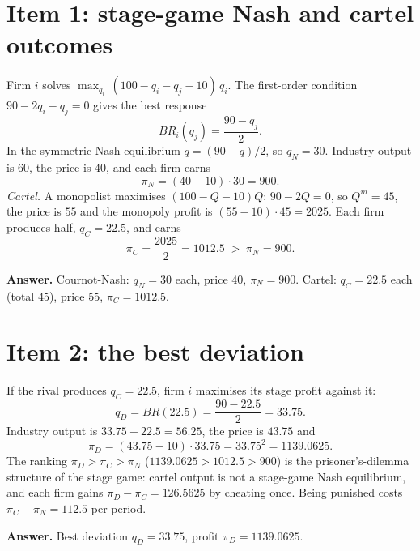 \documentclass[11pt,a4paper]{article}
\newcommand{\answer}[1]{\begin{tcolorbox}[colback=ans!5,colframe=ans,boxrule=0.6pt,
  left=5pt,right=5pt,top=3pt,bottom=3pt]\textbf{Answer.} #1\end{tcolorbox}}
\begin{document}
\section{Item 1: stage-game Nash and cartel outcomes}

Firm $i$ solves $\max_{q_i}\,(100 - q_i - q_j - 10)\,q_i$. The first-order condition
$90 - 2q_i - q_j = 0$ gives the best response
\[
BR_i(q_j) = \frac{90 - q_j}{2}.
\]
In the symmetric Nash equilibrium $q = (90 - q)/2$, so $q_N = 30$. Industry output is $60$, the price is
$40$, and each firm earns
\[
\pi_N = (40 - 10)\cdot 30 = 900.
\]
\emph{Cartel.} A monopolist maximises $(100 - Q - 10)Q$: $90 - 2Q = 0$, so $Q^m = 45$, the price is $55$
and the monopoly profit is $(55 - 10)\cdot 45 = 2025$. Each firm produces half, $q_C = 22.5$, and earns
\[
\pi_C = \frac{2025}{2} = 1012.5 \;>\; \pi_N = 900.
\]
\answer{Cournot-Nash: $q_N = 30$ each, price $40$, $\pi_N = 900$. Cartel: $q_C = 22.5$ each (total $45$),
price $55$, $\pi_C = 1012.5$.}

\section{Item 2: the best deviation}

If the rival produces $q_C = 22.5$, firm $i$ maximises its stage profit against it:
\[
q_D = BR(22.5) = \frac{90 - 22.5}{2} = 33.75.
\]
Industry output is $33.75 + 22.5 = 56.25$, the price is $43.75$ and
\[
\pi_D = (43.75 - 10)\cdot 33.75 = 33.75^2 = 1139.0625.
\]
The ranking $\pi_D > \pi_C > \pi_N$ ($1139.0625 > 1012.5 > 900$) is the prisoner's-dilemma structure of
the stage game: cartel output is not a stage-game Nash equilibrium, and each firm gains
$\pi_D - \pi_C = 126.5625$ by cheating once. Being punished costs $\pi_C - \pi_N = 112.5$ per period.

\answer{Best deviation $q_D = 33.75$, profit $\pi_D = 1139.0625$.}
\end{document}
